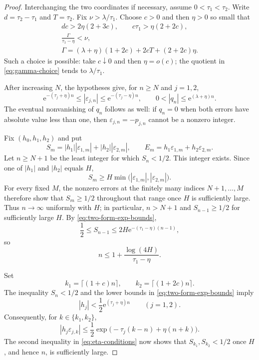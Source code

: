 \documentclass[preprint,12pt]{elsarticle}
\theoremstyle{definition}
\newcommand{\e}{\mathrm e}
\newcommand{\eps}{\varepsilon}
\newcommand{\abs}[1]{\left|#1\right|}
\begin{document}
\begin{proof}
Interchanging the two coordinates if necessary, assume
$0<\tau_1<\tau_2$.  Write $d=\tau_2-\tau_1$ and $T=\tau_2$.
Fix $\nu>\lambda/\tau_1$.  Choose $c>0$ and then $\eta>0$ so small that
\begin{gather}
 dc>2\eta(2+3c),
 \qquad
 c\tau_1>\eta(2+2c),                                      \label{eq:eta-conditions}\\
 \frac{\Gamma}{\tau_1-\eta}<\nu,                           \label{eq:gamma-choice}\\
 \Gamma=(\lambda+\eta)(1+2c)+2cT+(2+2c)\eta.              \label{eq:gamma}
\end{gather}
Such a choice is possible: take $c\downarrow0$ and then
$\eta=o(c)$; the quotient in \eqref{eq:gamma-choice} tends to
$\lambda/\tau_1$.

After increasing $N$, the hypotheses give, for $n\ge N$ and $j=1,2$,
\begin{equation}\label{eq:two-form-exp-bounds}
 \e^{-(\tau_j+\eta)n}
 \le\abs{\eps_{j,n}}
 \le\e^{-(\tau_j-\eta)n},
 \qquad
 0<\abs{q_n}\le\e^{(\lambda+\eta)n}.
\end{equation}
The eventual nonvanishing of $q_n$ follows as well: if $q_n=0$ when both
errors have absolute value less than one, then
$\eps_{j,n}=-p_{j,n}$ cannot be a nonzero integer.

Fix $(h_0,h_1,h_2)$ and put
\[
 S_m=|h_1|\abs{\eps_{1,m}}+|h_2|\abs{\eps_{2,m}},
 \qquad
 E_m=h_1\eps_{1,m}+h_2\eps_{2,m}.
\]
Let $n\ge N+1$ be the least integer for which $S_n<1/2$.
This integer exists.  Since one of $|h_1|$ and $|h_2|$ equals $H$,
\[
 S_m\ge H\min\bigl(|\eps_{1,m}|,|\eps_{2,m}|\bigr).
\]
For every fixed $M$, the nonzero errors at the finitely many indices
$N+1,\ldots,M$ therefore show that $S_m\ge1/2$ throughout that range once
$H$ is sufficiently large.  Thus $n\to\infty$ uniformly with $H$; in
particular, $n>N+1$ and $S_{n-1}\ge1/2$ for sufficiently large $H$.
By \eqref{eq:two-form-exp-bounds},
\[
 \frac12\le S_{n-1}
 \le2H\e^{-(\tau_1-\eta)(n-1)},
\]
so
\begin{equation}\label{eq:n-height}
 n\le1+\frac{\log(4H)}{\tau_1-\eta}.
\end{equation}

Set
\[
 k_1=\lceil(1+c)n\rceil,
 \qquad
 k_2=\lceil(1+2c)n\rceil.
\]
The inequality $S_n<1/2$ and the lower bounds in
\eqref{eq:two-form-exp-bounds} imply
\[
 |h_j|<\frac12\e^{(\tau_j+\eta)n}\qquad(j=1,2).
\]
Consequently, for $k\in\{k_1,k_2\}$,
\[
 |h_j\eps_{j,k}|
 \le\frac12
 \exp\!\bigl(-\tau_j(k-n)+\eta(n+k)\bigr).
\]
The second inequality in \eqref{eq:eta-conditions} now shows that
$S_{k_1},S_{k_2}<1/2$ once $H$, and hence $n$, is sufficiently large.


\end{proof}
\end{document}

